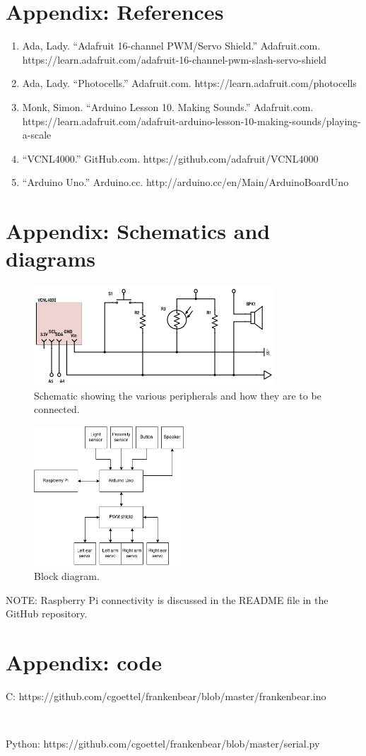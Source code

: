 \documentclass{article}
\begin{document}
\section*{Appendix: References}
\begin{enumerate}
    \item Ada, Lady. ``Adafruit 16-channel PWM/Servo Shield.'' Adafruit.com. https://learn.adafruit.com/adafruit-16-channel-pwm-slash-servo-shield
    \item Ada, Lady. ``Photocells.'' Adafruit.com. https://learn.adafruit.com/photocells
    \item Monk, Simon. ``Arduino Lesson 10. Making Sounds.'' Adafruit.com. https://learn.adafruit.com/adafruit-arduino-lesson-10-making-sounds/playing-a-scale
    \item ``VCNL4000.'' GitHub.com. https://github.com/adafruit/VCNL4000
    \item ``Arduino Uno.'' Arduino.cc. http://arduino.cc/en/Main/ArduinoBoardUno
\end{enumerate}

\clearpage
\section*{Appendix: Schematics and diagrams}
\begin{figure}[hbt]
    \centering
    \includegraphics[width=0.8\textwidth]{schematic}
    \caption{Schematic showing the various peripherals and how they are to be connected.}
    \label{fig:schematic}
\end{figure}

\begin{figure}[hbt]
    \centering
    \includegraphics[width=0.5\textwidth]{block-diagram}
    \caption{Block diagram.}
    \label{fig:schematic}
\end{figure}

NOTE: Raspberry Pi connectivity is discussed in the README file in the GitHub repository.

\clearpage
\section*{Appendix: code}
C: https://github.com/cgoettel/frankenbear/blob/master/frankenbear.ino

~

\noindent Python: https://github.com/cgoettel/frankenbear/blob/master/serial.py
\end{document}
